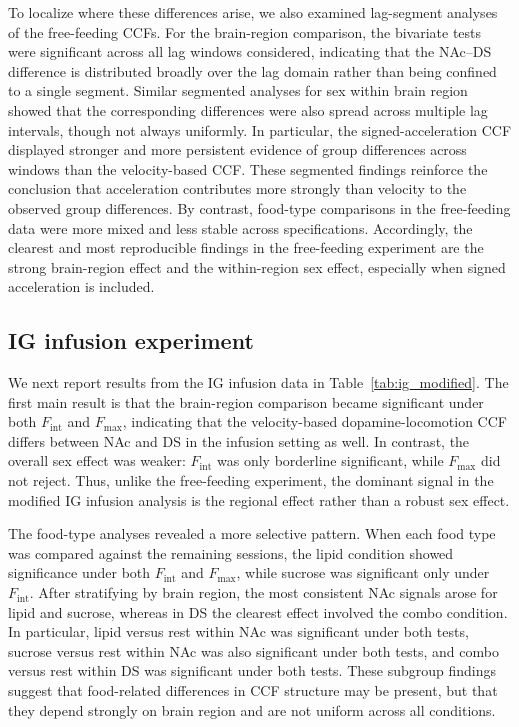 \documentclass[12pt]{article}
\begin{document}
To localize where these differences arise, we also examined lag-segment analyses of the free-feeding CCFs. For the brain-region comparison, the bivariate tests were significant across all lag windows considered, indicating that the NAc--DS difference is distributed broadly over the lag domain rather than being confined to a single segment. Similar segmented analyses for sex within brain region showed that the corresponding differences were also spread across multiple lag intervals, though not always uniformly. In particular, the signed-acceleration CCF displayed stronger and more persistent evidence of group differences across windows than the velocity-based CCF. These segmented findings reinforce the conclusion that acceleration contributes more strongly than velocity to the observed group differences. By contrast, food-type comparisons in the free-feeding data were more mixed and less stable across specifications. Accordingly, the clearest and most reproducible findings in the free-feeding experiment are the strong brain-region effect and the within-region sex effect, especially when signed acceleration is included.

\subsection{IG infusion experiment}

We next report results from the IG infusion data in Table~\ref{tab:ig_modified}. 
The first main result is that the brain-region comparison became significant under both \(F_{\mathrm{int}}\) and \(F_{\max}\), indicating that the velocity-based dopamine-locomotion CCF differs between NAc and DS in the infusion setting as well. In contrast, the overall sex effect was weaker: \(F_{\mathrm{int}}\) was only borderline significant, while \(F_{\max}\) did not reject. Thus, unlike the free-feeding experiment, the dominant signal in the modified IG infusion analysis is the regional effect rather than a robust sex effect.

The food-type analyses revealed a more selective pattern. When each food type was compared against the remaining sessions, the lipid condition showed significance under both \(F_{\mathrm{int}}\) and \(F_{\max}\), while sucrose was significant only under \(F_{\mathrm{int}}\). After stratifying by brain region, the most consistent NAc signals arose for lipid and sucrose, whereas in DS the clearest effect involved the combo condition. In particular, lipid versus rest within NAc was significant under both tests, sucrose versus rest within NAc was also significant under both tests, and combo versus rest within DS was significant under both tests. These subgroup findings suggest that food-related differences in CCF structure may be present, but that they depend strongly on brain region and are not uniform across all conditions.
\end{document}
